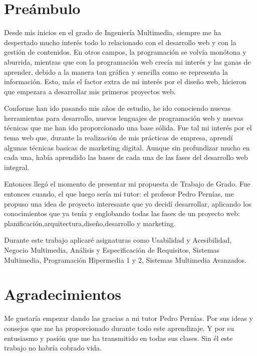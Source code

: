 \chapter*{Preámbulo}

Desde mis inicios en el grado de Ingeniería Multimedia, siempre me ha despertado mucho interés todo lo relacionado con el desarrollo web y
con la gestión de contenidos. En otros campos, la programación se volvía monótona y aburrida, mientras que con la programación web crecía mi interés y
las ganas de aprender, debido a la manera tan gráfica y sencilla como se representa la información. Esto, más el factor extra de mi interés por
el diseño web, hicieron que empezara a desarrollar mis primeros proyectos web.

\vspace{5 mm}

Conforme han ido pasando mis años de estudio, he ido conociendo nuevas herramientas para desarrollo, nuevos lenguajes de programación web y nuevas técnicas que me
han ido proporcionado una base sólida. Fue tal mi interés por el tema web que, durante la realización de mis prácticas de empresa, aprendí algunas técnicas basicas de
marketing digital. Aunque sin profundizar mucho en cada una, había aprendido las bases de cada una de las fases del desarrollo web integral.

\vspace{5 mm}

Entonces llegó el momento de presentar mi propuesta de Trabajo de Grado. Fue entonces cuando, el que luego sería mi tutor: el profesor Pedro Pernías, me propuso una idea de proyecto interesante que yo decidí
desarrollar, aplicando los conocimientos que ya tenía y englobando todas las fases de un proyecto web: planificación,arquitectura,diseño,desarrollo y marketing.

\vspace{5 mm}

Durante este trabajo aplicaré asignaturas como Usabilidad y Acesibilidad, Negocio Multimedia, Análisis y Especificación de Requisitos, Sistemas Multimedia,
Programación Hipermedia 1 y 2, Sistemas Multimedia Avanzados.




\chapter*{Agradecimientos}

Me gustaría empezar dando las gracias a mi tutor Pedro Pernías. Por sus ideas y consejos que me ha proporcionado durante todo este aprendizaje.
Y por su entusiasmo y pasión que me ha transmitido en todas sus clases. Sin él este trabajo no habría cobrado vida.

